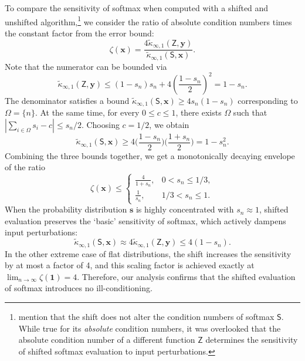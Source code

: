 \documentclass[namedate,webpdf,imanum]{ima-authoring-template}
\newcommand{\Matrix}[1]{\mathbf{#1}}
\newcommand{\One}{\Matrix{1}}
\newcommand{\Layer}[1]{\mathsf{#1}}
\newcommand{\condabs}[3][]{\tilde{\kappa}_{\mathrm{#2}} #1( #3 #1)}
\numberwithin{equation}{section}
\begin{document}
To compare the sensitivity of softmax when computed with a shifted and unshifted algorithm,\footnote{\cite{blanchard2021accurately} mention that the shift does not alter the condition numbers of softmax $\Layer{S}$. While true for its \emph{absolute} condition numbers, it was overlooked that the absolute condition number of a different function $\Layer{Z}$ determines the sensitivity of shifted softmax evaluation to input perturbations.} we consider the ratio of absolute condition numbers times the constant factor from the error bound:
\begin{equation*}
    \zeta(\Matrix{x}) = \frac{4\condabs{\infty,1}{\Layer{Z}, \Matrix{y}}}{\condabs{\infty,1}{\Layer{S}, \Matrix{x}}}.
\end{equation*}
Note that the numerator can be bounded via
\begin{equation*}
    \condabs{\infty,1}{\Layer{Z}, \Matrix{y}} \leq (1 - s_n) s_n + 4 \left( \frac{1 - s_n}{2} \right)^2 = 1 - s_n.
\end{equation*}
The denominator satisfies a bound $\condabs{\infty,1}{\Layer{S}, \Matrix{x}} \geq 4 s_n (1 - s_n)$ corresponding to $\Omega = \{ n \}$.
At the same time, for every $0 \leq c \leq 1$, there exists $\Omega$ such that $| \sum_{i \in \Omega} s_i - c | \leq s_n / 2$.
Choosing $c = 1/2$, we obtain
\begin{equation*}
    \condabs{\infty,1}{\Layer{S}, \Matrix{x}} \geq 4 \Big( \frac{1 - s_n}{2} \Big) \Big( \frac{1 + s_n}{2} \Big) = 1 - s_n^2.
\end{equation*}
Combining the three bounds together, we get a monotonically decaying envelope of the ratio
\begin{equation*}
    \zeta(\Matrix{x}) \leq \begin{cases}
        \frac{4}{1 + s_n}, & 0 < s_n \leq 1/3, \\
        \frac{1}{s_n}, & 1/3 < s_n \leq 1.
    \end{cases}
\end{equation*}
When the probability distribution $\Matrix{s}$ is highly concentrated with $s_n \approx 1$, shifted evaluation preserves the `basic' sensitivity of softmax, which actively dampens input perturbations:
\begin{equation*}
    \condabs{\infty,1}{\Layer{S}, \Matrix{x}} \approx 4\condabs{\infty,1}{\Layer{Z}, \Matrix{y}} \leq 4(1 - s_n).
\end{equation*}
In the other extreme case of flat distributions, the shift increases the sensitivity by at most a factor of 4, and this scaling factor is achieved exactly at $\lim_{n \to \infty} \zeta(\One) = 4$.
Therefore, our analysis confirms that the shifted evaluation of softmax introduces no ill-conditioning.
\end{document}
